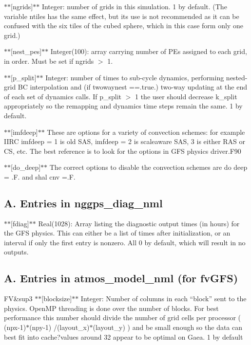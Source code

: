 $\ast$$\ast$\mbox{[}ngrids\mbox{]}$\ast$$\ast$ Integer\-: number of grids in this simulation. 1 by default. (The variable ntiles has the same effect, but its use is not recommended as it can be confused with the six tiles of the cubed sphere, which in this case form only one grid.)

$\ast$$\ast$\mbox{[}nest\-\_\-pes\mbox{]}$\ast$$\ast$ Integer(100)\-: array carrying number of P\-Es assigned to each grid, in order. Must be set if ngrids $>$ 1.

$\ast$$\ast$\mbox{[}p\-\_\-split\mbox{]}$\ast$$\ast$ Integer\-: number of times to sub-\/cycle dynamics, performing nested-\/grid B\-C interpolation and (if twowaynest ==.true.) two-\/way updating at the end of each set of dynamics calls. If p\-\_\-split $>$ 1 the user should decrease k\-\_\-split appropriately so the remapping and dynamics time steps remain the same. 1 by default.

$\ast$$\ast$\mbox{[}imfdeep\mbox{]}$\ast$$\ast$ These are options for a variety of convection schemes\-: for example I\-I\-R\-C imfdeep = 1 is old S\-A\-S, imfdeep = 2 is scaleaware S\-A\-S, 3 is either R\-A\-S or C\-S, etc. The best reference is to look for the options in G\-F\-S physics driver.\-F90

$\ast$$\ast$\mbox{[}do\-\_\-deep\mbox{]}$\ast$$\ast$ The correct options to disable the convection schemes are do deep = .F. and shal cnv =.F.

\subsection*{A. Entries in nggps\-\_\-diag\-\_\-nml}

$\ast$$\ast$\mbox{[}fdiag\mbox{]}$\ast$$\ast$ Real(1028)\-: Array listing the diagnostic output times (in hours) for the G\-F\-S physics. This can either be a list of times after initialization, or an interval if only the first entry is nonzero. All 0 by default, which will result in no outputs.

\subsection*{A. Entries in atmos\-\_\-model\-\_\-nml (for fv\-G\-F\-S)}

F\-V\&sup3 $\ast$$\ast$\mbox{[}blocksize\mbox{]}$\ast$$\ast$ Integer\-: Number of columns in each ``block'' sent to the physics. Open\-M\-P threading is done over the number of blocks. For best performance this number should divide the number of grid cells per processor ( (npx-\/1)$\ast$(npy-\/1) /(layout\-\_\-x)$\ast$(layout\-\_\-y) ) and be small enough so the data can best fit into cache?values around 32 appear to be optimal on Gaea. 1 by default

